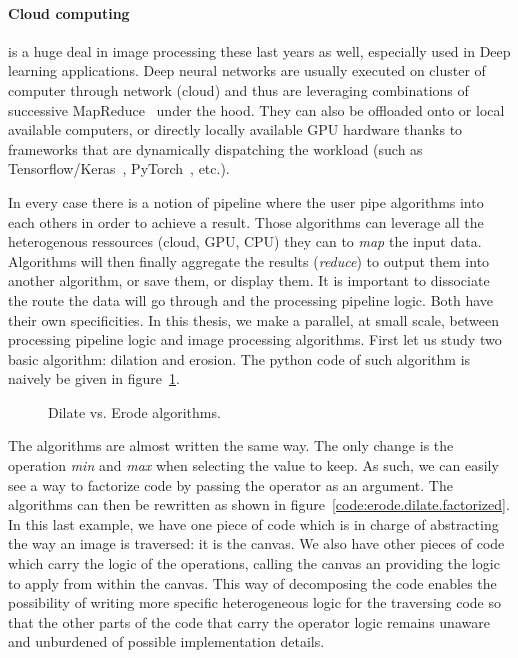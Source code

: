 \paragraph{Cloud computing} is a huge deal in image processing these last years as well, especially used in Deep
learning applications. Deep neural networks are usually executed on cluster of computer through network (cloud) and
thus are leveraging combinations of successive MapReduce~\parencite{dean.2008.mapreduce} under the hood. They can also
be offloaded onto or local available computers, or directly locally available GPU hardware thanks to frameworks that are
dynamically dispatching the workload (such as
Tensorflow/Keras~\parencite{tensorflow.2015.whitepaper,chollet.2015.keras,gulli.2017.deep},
PyTorch~\parencite{paszke.2019.pytorch}, etc.).

In every case there is a notion of pipeline where the user pipe algorithms into each others in order to achieve a
result. Those algorithms can leverage all the heterogenous ressources (cloud, GPU, CPU) they can to \emph{map} the input
data. Algorithms will then finally aggregate the results (\emph{reduce}) to output them into another algorithm, or save
them, or display them. It is important to dissociate the route the data will go through and the processing pipeline
logic. Both have their own specificities. In this thesis, we make a parallel, at small scale, between processing
pipeline logic and image processing algorithms. First let us study two basic algorithm: dilation and erosion. The python
code of such algorithm is naively be given in figure~\ref{code:erode.dilate}.

\begin{figure}[htbp]
  \centering
  \hfil
  \caption{Dilate vs. Erode algorithms.}
  \label{code:erode.dilate}
\end{figure}

The algorithms are almost written the same way. The only change is the operation \emph{min} and \emph{max} when
selecting the value to keep. As such, we can easily see a way to factorize code by passing the operator as an argument.
The algorithms can then be rewritten as shown in figure~\ref{code:erode.dilate.factorized}. In this last example, we
have one piece of code which is in charge of abstracting the way an image is traversed: it is the canvas. We also have
other pieces of code which carry the logic of the operations, calling the canvas an providing the logic to apply from
within the canvas. This way of decomposing the code enables the possibility of writing more specific heterogeneous logic
for the traversing code so that the other parts of the code that carry the operator logic remains unaware and unburdened
of possible implementation details.

